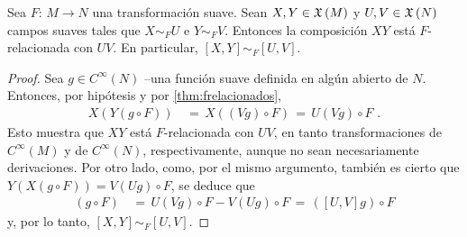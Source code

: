 \begin{propoCorcheteFRelacionados}\label{thm:corchetefrelacionados}
	Sea $F:\,M\rightarrow N$ una transformaci\'{o}n suave. Sean
	$X,Y\in\mathfrak{X}\left(M\right)$ y $U,V\in\mathfrak{X}\left(N\right)$ campos suaves tales que
	$X\sim_{F}U$ e $Y\sim_{F}V$. Entonces la composici\'{o}n
	$XY$ est\'{a} $F$-relacionada con $UV$. En particular,
	$[X,Y]\sim_{F}[U,V]$.
\end{propoCorcheteFRelacionados}

\begin{proof}
	Sea $g\in C^{\infty}(N)$ --una funci\'{o}n suave definida en
	alg\'{u}n abierto de $N$. Entonces, por hip\'{o}tesis y por
	\ref{thm:frelacionados},
	\begin{align*}
		X(Y(g\circ F)) & \,=\,X((Vg)\circ F) \,=\,
			U(Vg)\circ F
		\text{ .}
	\end{align*}
	Esto muestra que $XY$ est\'{a} $F$-relacionada con $UV$, en tanto
	transformaciones de $C^{\infty}(M)$ y de $C^{\infty}(N)$,
	respectivamente, aunque no sean necesariamente derivaciones. Por
	otro lado, como, por el mismo argumento, tambi\'{e}n es cierto que
	$Y(X(g\circ F))=V(Ug)\circ F$, se deduce que
	\begin{align*}
		[X,Y](g\circ F) & \,=\,U(Vg)\circ F - V(Ug)\circ F \,=\,
			([U,V]g)\circ F
	\end{align*}
	y, por lo tanto, $[X,Y]\sim_{F}[U,V]$.
\end{proof}


